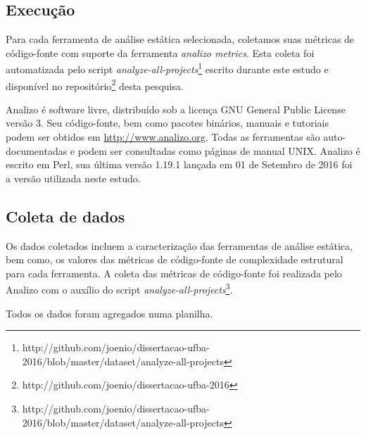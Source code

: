 \subsection{Execução}

Para cada ferramenta de análise estática selecionada, coletamos  suas métricas de código-fonte
com suporte da ferramenta {\it analizo metrics}. 
Esta coleta foi automatizada pelo script {\it
analyze-all-projects}\footnote{http://github.com/joenio/dissertacao-ufba-2016/blob/master/dataset/analyze-all-projects}
escrito durante este estudo e  disponível no
repositório\footnote{http://github.com/joenio/dissertacao-ufba-2016} desta
pesquisa.

Analizo é software livre, distribuído sob a licença GNU General Public License
versão 3. Seu código-fonte, bem como pacotes binários, manuais e tutoriais
podem ser obtidos em \url{http://www.analizo.org}. Todas as ferramentas são
auto-documentadas e podem ser consultadas como páginas de manual UNIX. 
Analizo é escrito em Perl, sua última versão 1.19.1 lançada em 01 de Setembro de 2016
foi a versão utilizada neste estudo.

\subsection{Coleta de dados} \label{analise}

Os dados coletados incluem a caracterização das ferramentas de análise
estática, bem como, os valores das métricas de código-fonte de complexidade
estrutural para cada ferramenta. A coleta das métricas de
código-fonte foi realizada pelo Analizo com o auxílio do script {\em
analyze-all-projects}\footnote{http://github.com/joenio/dissertacao-ufba-2016/blob/master/dataset/analyze-all-projects}. 

Todos os dados foram agregados numa planilha.

